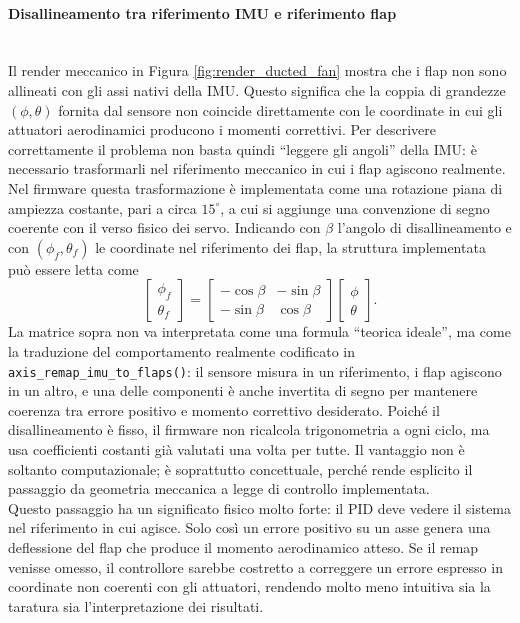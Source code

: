 \documentclass[11pt]{report}
\begin{document}
	\paragraph{Disallineamento tra riferimento IMU e riferimento flap}\mbox{}\\
	Il render meccanico in Figura \ref{fig:render_ducted_fan} mostra che i flap non sono allineati con gli assi nativi della IMU. Questo significa che la coppia di grandezze $(\phi,\theta)$ fornita dal sensore non coincide direttamente con le coordinate in cui gli attuatori aerodinamici producono i momenti correttivi. Per descrivere correttamente il problema non basta quindi ``leggere gli angoli'' della IMU: è necessario trasformarli nel riferimento meccanico in cui i flap agiscono realmente.\\
	Nel firmware questa trasformazione è implementata come una rotazione piana di ampiezza costante, pari a circa $15^{\circ}$, a cui si aggiunge una convenzione di segno coerente con il verso fisico dei servo. Indicando con $\beta$ l'angolo di disallineamento e con $(\phi_f,\theta_f)$ le coordinate nel riferimento dei flap, la struttura implementata può essere letta come
	\begin{equation}
		\begin{bmatrix}
		\phi_f \\
		\theta_f
		\end{bmatrix}
		=
		\begin{bmatrix}
		-\cos\beta & -\sin\beta \\
		-\sin\beta & \cos\beta
		\end{bmatrix}
		\begin{bmatrix}
		\phi \\
		\theta
		\end{bmatrix}.
	\end{equation}
	La matrice sopra non va interpretata come una formula ``teorica ideale'', ma come la traduzione del comportamento realmente codificato in \texttt{axis\_remap\_imu\_to\_flaps()}: il sensore misura in un riferimento, i flap agiscono in un altro, e una delle componenti è anche invertita di segno per mantenere coerenza tra errore positivo e momento correttivo desiderato. Poiché il disallineamento è fisso, il firmware non ricalcola trigonometria a ogni ciclo, ma usa coefficienti costanti già valutati una volta per tutte. Il vantaggio non è soltanto computazionale; è soprattutto concettuale, perché rende esplicito il passaggio da geometria meccanica a legge di controllo implementata.\\
	Questo passaggio ha un significato fisico molto forte: il PID deve vedere il sistema nel riferimento in cui agisce. Solo così un errore positivo su un asse genera una deflessione del flap che produce il momento aerodinamico atteso. Se il remap venisse omesso, il controllore sarebbe costretto a correggere un errore espresso in coordinate non coerenti con gli attuatori, rendendo molto meno intuitiva sia la taratura sia l'interpretazione dei risultati.\\
\end{document}
